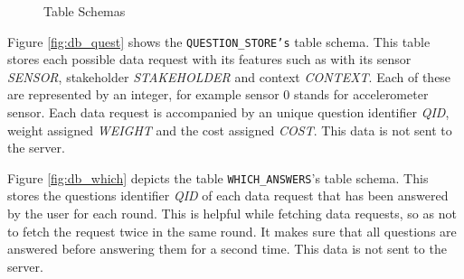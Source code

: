 \begin{figure}[htp]
\hspace{1em}
\caption{Table Schemas}
\label{fig:ts1}
\end{figure}


Figure \ref{fig:db_quest} shows the \texttt{QUESTION\_STORE's} table schema. This table stores each possible data request with its features such as with its sensor \textit{SENSOR}, stakeholder \textit{STAKEHOLDER} and context \textit{CONTEXT}. Each of these are represented by an integer, for example sensor 0 stands for accelerometer sensor. Each data request is accompanied by
an unique question identifier \textit{QID}, weight assigned \textit{WEIGHT} and the cost assigned \textit{COST}. This data is not sent to 
the server.

Figure \ref{fig:db_which} depicts the table \texttt{WHICH\_ANSWERS}'s table schema. This stores the questions identifier \textit{QID} of each data request that has
been answered by the user for each round. This is helpful while fetching data requests, so as not to fetch the request twice in the same round. It makes sure that all questions are answered before answering them for a second time. This data is not sent to the server.


